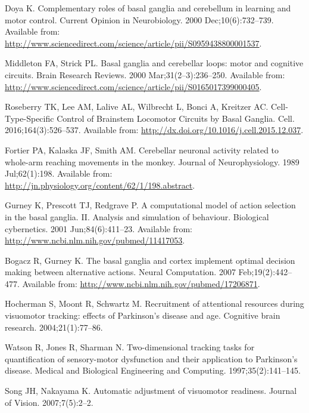 \documentclass[10pt,letterpaper]{article}
\begin{document}
\begin{thebibliography}{10}
Doya K.
\newblock Complementary roles of basal ganglia and cerebellum in learning and
  motor control.
\newblock Current Opinion in Neurobiology. 2000 Dec;10(6):732--739.
\newblock Available from:
  \url{http://www.sciencedirect.com/science/article/pii/S0959438800001537}.

Middleton FA, Strick PL.
\newblock Basal ganglia and cerebellar loops: motor and cognitive circuits.
\newblock Brain Research Reviews. 2000 Mar;31(2–3):236--250.
\newblock Available from:
  \url{http://www.sciencedirect.com/science/article/pii/S0165017399000405}.

Roseberry TK, Lee AM, Lalive AL, Wilbrecht L, Bonci A, Kreitzer AC.
\newblock Cell-{Type}-{Specific} {Control} of {Brainstem} {Locomotor}
  {Circuits} by {Basal} {Ganglia}.
\newblock Cell. 2016;164(3):526--537.
\newblock Available from: \url{http://dx.doi.org/10.1016/j.cell.2015.12.037}.

Fortier PA, Kalaska JF, Smith AM.
\newblock Cerebellar neuronal activity related to whole-arm reaching movements
  in the monkey.
\newblock Journal of Neurophysiology. 1989 Jul;62(1):198.
\newblock Available from:
  \url{http://jn.physiology.org/content/62/1/198.abstract}.

Gurney K, Prescott TJ, Redgrave P.
\newblock A computational model of action selection in the basal ganglia. {II}.
  {Analysis} and simulation of behaviour.
\newblock Biological cybernetics. 2001 Jun;84(6):411--23.
\newblock Available from: \url{http://www.ncbi.nlm.nih.gov/pubmed/11417053}.

Bogacz R, Gurney K.
\newblock The basal ganglia and cortex implement optimal decision making
  between alternative actions.
\newblock Neural Computation. 2007 Feb;19(2):442--477.
\newblock Available from: \url{http://www.ncbi.nlm.nih.gov/pubmed/17206871}.

Hocherman S, Moont R, Schwartz M.
\newblock Recruitment of attentional resources during visuomotor tracking:
  effects of {Parkinson}'s disease and age.
\newblock Cognitive brain research. 2004;21(1):77--86.

Watson R, Jones R, Sharman N.
\newblock Two-dimensional tracking tasks for quantification of sensory-motor
  dysfunction and their application to {Parkinson}'s disease.
\newblock Medical and Biological Engineering and Computing.
  1997;35(2):141--145.

Song JH, Nakayama K.
\newblock Automatic adjustment of visuomotor readiness.
\newblock Journal of Vision. 2007;7(5):2--2.

\end{thebibliography}
\end{document}

